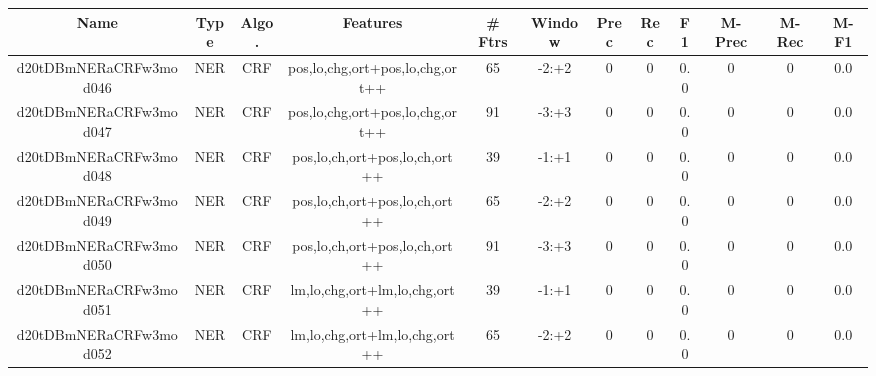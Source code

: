 \documentclass[a4paper]{article}
\begin{document}
\begin{landscape}
\begin{center}
\begin{tabular}{ |c|c|c|c|c|c|c|c|c|c|c|c|}
 \hline
\end{tabular}
\end{center}




\begin{center}
\begin{tabular}{ |c|c|c|c|c|c|c|c|c|c|c|c|} 
 \hline
 	Name & Type & Algo. & Features & \# Ftrs & Window & Prec & Rec & F1 & M-Prec & M-Rec & M-F1\\
 \hline

 	

 
 	
 	\small{ d20tDBmNERaCRFw3mod046 } & \small{ NER} & \small{  CRF }  & pos,lo,chg,ort+pos,lo,chg,ort++  &  65 &  \small{  -2:+2 }  &  0 & 0 & 0.0  &  0 & 0 & 0.0 \\
 	

 
 	
 	\small{ d20tDBmNERaCRFw3mod047 } & \small{ NER} & \small{  CRF }  & pos,lo,chg,ort+pos,lo,chg,ort++  &  91 &  \small{  -3:+3 }  &  0 & 0 & 0.0  &  0 & 0 & 0.0 \\
 	

 
 	
 	\small{ d20tDBmNERaCRFw3mod048 } & \small{ NER} & \small{  CRF }  & pos,lo,ch,ort+pos,lo,ch,ort++  &  39 &  \small{  -1:+1 }  &  0 & 0 & 0.0  &  0 & 0 & 0.0 \\
 	

 
 	
 	\small{ d20tDBmNERaCRFw3mod049 } & \small{ NER} & \small{  CRF }  & pos,lo,ch,ort+pos,lo,ch,ort++  &  65 &  \small{  -2:+2 }  &  0 & 0 & 0.0  &  0 & 0 & 0.0 \\
 	

 
 	
 	\small{ d20tDBmNERaCRFw3mod050 } & \small{ NER} & \small{  CRF }  & pos,lo,ch,ort+pos,lo,ch,ort++  &  91 &  \small{  -3:+3 }  &  0 & 0 & 0.0  &  0 & 0 & 0.0 \\
 	

 
 	
 	\small{ d20tDBmNERaCRFw3mod051 } & \small{ NER} & \small{  CRF }  & lm,lo,chg,ort+lm,lo,chg,ort++  &  39 &  \small{  -1:+1 }  &  0 & 0 & 0.0  &  0 & 0 & 0.0 \\
 	

 
 	
 	\small{ d20tDBmNERaCRFw3mod052 } & \small{ NER} & \small{  CRF }  & lm,lo,chg,ort+lm,lo,chg,ort++  &  65 &  \small{  -2:+2 }  &  0 & 0 & 0.0  &  0 & 0 & 0.0 \\
 	


\end{tabular}
\end{center}
\end{landscape}
\end{document}
